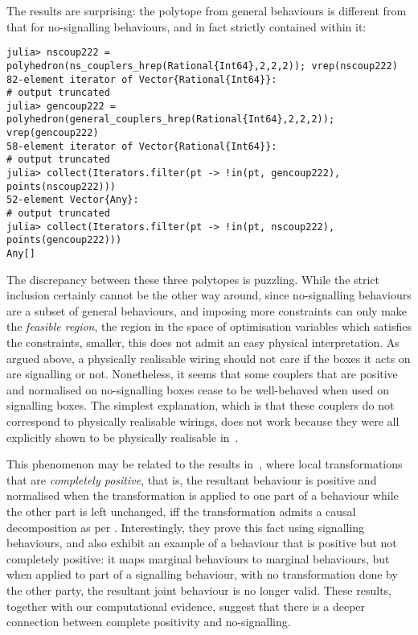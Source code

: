 \documentclass[10pt, a4paper]{article}
\numberwithin{equation}{section} %
\theoremstyle{definition}
\theoremstyle{plain}
\newcommand{\?}{\mathrel{?}} %
\begin{document}
                  The results are surprising: the polytope from general behaviours is different from that for no-signalling behaviours, and in fact strictly contained within it:
                  \begin{lstlisting}
julia> nscoup222 = polyhedron(ns_couplers_hrep(Rational{Int64},2,2,2)); vrep(nscoup222)
82-element iterator of Vector{Rational{Int64}}:
# output truncated
julia> gencoup222 = polyhedron(general_couplers_hrep(Rational{Int64},2,2,2)); vrep(gencoup222)
58-element iterator of Vector{Rational{Int64}}:
# output truncated
julia> collect(Iterators.filter(pt -> !in(pt, gencoup222), points(nscoup222)))
52-element Vector{Any}:
# output truncated
julia> collect(Iterators.filter(pt -> !in(pt, nscoup222), points(gencoup222)))
Any[]
                  \end{lstlisting}
                  The discrepancy between these three polytopes is puzzling. While the strict inclusion certainly cannot be the other way around, since no-signalling behaviours are a subset of general behaviours, and imposing more constraints can only make the \emph{feasible region}, the region in the space of optimisation variables which satisfies the constraints, smaller, this does not admit an easy physical interpretation. As argued above, a physically realisable wiring should not care if the boxes it acts on are signalling or not. Nonetheless, it seems that some couplers that are positive and normalised on no-signalling boxes cease to be well-behaved when used on signalling boxes. The simplest explanation, which is that these couplers do not correspond to physically realisable wirings, does not work because they were all explicitly shown to be physically realisable in~\cite{ShortEntangleSwap}.

                  This phenomenon may be related to the results in~\cite[Sec. 1.5]{LocalTransformations}, where local transformations that are \emph{completely positive}, that is, the resultant behaviour is positive and normalised when the transformation is applied to one part of a behaviour while the other part is left unchanged, iff the transformation admits a causal decomposition as per . Interestingly, they prove this fact using signalling behaviours, and also exhibit an example of a behaviour that is positive but not completely positive: it maps marginal behaviours to marginal behaviours, but when applied to part of a signalling behaviour, with no transformation done by the other party, the resultant joint behaviour is no longer valid. These results, together with our computational evidence, suggest that there is a deeper connection between complete positivity and no-signalling.
\end{document}
